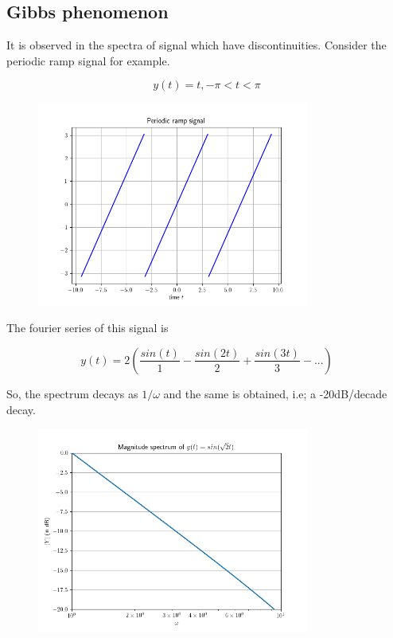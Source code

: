 \documentclass[12pt, a4paper]{article}
\begin{document}
\subsection{Gibbs phenomenon}

It is observed in the spectra of signal which have discontinuities. Consider the periodic ramp signal for example.

\begin{equation*}
y(t) = t, -\pi < t < \pi
\end{equation*}

\begin{figure}[H]
\centering
\includegraphics[width=0.8\textwidth]{ex4_1.png}
\end{figure}

The fourier series of this signal is 

\begin{equation*}
y(t) = 2\left( \frac{sin(t)}{1} - \frac{sin(2t)}{2} + \frac{sin(3t)}{3} - ... \right)
\end{equation*}

So, the spectrum decays as $1/\omega$ and the same is obtained, i.e; a -20dB/decade decay.

\begin{figure}[H]
\centering
\includegraphics[width=0.8\textwidth]{ex4_2.png}
\end{figure}
\end{document}
